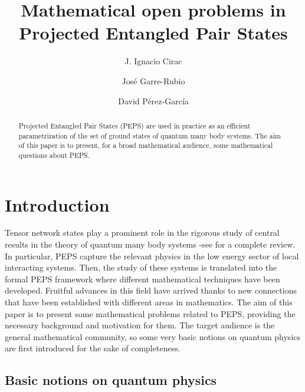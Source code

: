 \documentclass[smallextended]{svjour3}
\renewcommand{\1}{\mathbbm{1}}
\begin{document}
\title{Mathematical open problems in Projected Entangled Pair States}

\author{J. Ignacio Cirac \and Jos\'e Garre-Rubio \and David P\'{e}rez-Garc\'{i}a}


\maketitle

\begin{abstract}
    Projected Entangled Pair States (PEPS) are used in practice as an efficient parametrization of the set of ground states of quantum many body systems. The aim of this paper is to present, for a broad mathematical audience, some mathematical questions about PEPS.

\end{abstract}

\section{Introduction}
Tensor network states play a prominent role in the rigorous study of central results in the theory of quantum many body systems -see \cite{reviewPEPS} for a complete review. In particular, PEPS capture the relevant physics in the low energy sector of local interacting systems. Then, the study of these systems is translated into the formal PEPS framework where different mathematical techniques have been developed. Fruitful advances in this field have arrived thanks to new connections that have been established with different areas in mathematics.
The aim of this paper is to present some mathematical problems related to PEPS, providing the necessary background and motivation for them. The target audience is the general mathematical community, so some very basic notions on quantum physics are first introduced for the sake of completeness.

\subsection{Basic notions on quantum physics}
\end{document}

